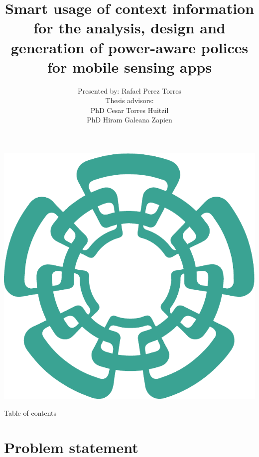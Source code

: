 \documentclass[compress,9pt,xcolor={dvipsnames,table}]{beamer}
\title[Smart usage of context information for the analysis, design and generation of power-aware polices for mobile sensing apps]{ Smart usage of context information for the analysis, design and generation of power-aware polices for mobile sensing apps}
\author[Rafael Perez Torres]{Presented by: Rafael Perez Torres\\[0.5cm] Thesis advisors:\\PhD Cesar Torres Huitzil\\PhD Hiram Galeana Zapien}
\institute{Cinvestav Tamaulipas}
\date{}
\begin{document}
\begin{frame}[plain]
  \begin{center}
  \includegraphics[scale=0.12]{../../../resources/images/vectors/cinvestav-logo-no-text}
  \end{center}
  \titlepage
  
\end{frame}


\begin{frame}{Table of contents}
	\tableofcontents[hideallsubsections]
\end{frame}

\section{Problem statement}
\end{document}
